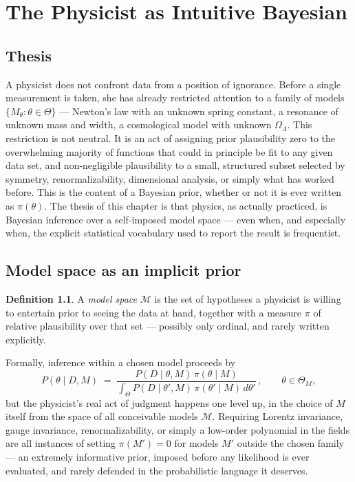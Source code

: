\documentclass[11pt]{book}
\title{}
\author{}
\date{}
\theoremstyle{definition}
\newtheorem{definition}{Definition}[chapter]
\theoremstyle{plain}
\theoremstyle{remark}
\begin{document}
\chapter{The Physicist as Intuitive Bayesian}

\section{Thesis}

A physicist does not confront data from a position of ignorance. Before a single measurement is taken, she has already restricted attention to a family of models $\{M_\theta : \theta \in \Theta\}$ --- Newton's law with an unknown spring constant, a resonance of unknown mass and width, a cosmological model with unknown $\Omega_\Lambda$. This restriction is not neutral. It is an act of assigning prior plausibility zero to the overwhelming majority of functions that could in principle be fit to any given data set, and non-negligible plausibility to a small, structured subset selected by symmetry, renormalizability, dimensional analysis, or simply what has worked before. This is the content of a Bayesian prior, whether or not it is ever written as $\pi(\theta)$. The thesis of this chapter is that physics, as actually practiced, is Bayesian inference over a self-imposed model space --- even when, and especially when, the explicit statistical vocabulary used to report the result is frequentist.

\section{Model space as an implicit prior}

\begin{definition}
A \emph{model space} $\mathcal{M}$ is the set of hypotheses a physicist is willing to entertain prior to seeing the data at hand, together with a measure $\pi$ of relative plausibility over that set --- possibly only ordinal, and rarely written explicitly.
\end{definition}

Formally, inference within a chosen model proceeds by
\begin{equation}
P(\theta \mid D, M) \;=\; \frac{P(D \mid \theta, M)\,\pi(\theta \mid M)}{\displaystyle\int_{\Theta} P(D \mid \theta', M)\,\pi(\theta' \mid M)\, d\theta'}\,, \qquad \theta \in \Theta_M,
\end{equation}
but the physicist's real act of judgment happens one level up, in the choice of $M$ itself from the space of all conceivable models $\mathcal{M}$. Requiring Lorentz invariance, gauge invariance, renormalizability, or simply a low-order polynomial in the fields are all instances of setting $\pi(M') = 0$ for models $M'$ outside the chosen family --- an extremely informative prior, imposed before any likelihood is ever evaluated, and rarely defended in the probabilistic language it deserves.
\end{document}
